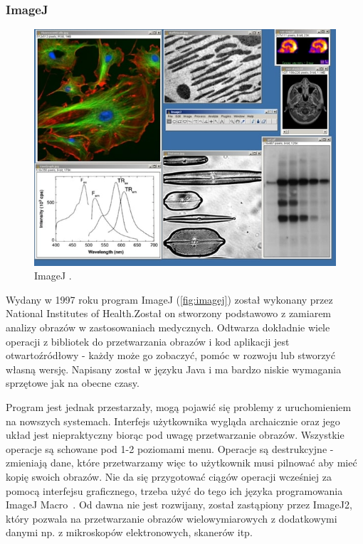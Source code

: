 \subsubsection{ImageJ}
\begin{figure}[H]
    \centering
    \includegraphics[width=0.8\linewidth]{./images/Picture3.jpg}
    \caption{ImageJ \cite{imagej}.}
    \label{fig:imagej}
\end{figure}

Wydany w 1997 roku program ImageJ (\autoref{fig:imagej}) został wykonany przez National Institutes of Health.Został on stworzony podstawowo z zamiarem analizy obrazów w zastosowaniach medycznych. 
Odtwarza dokładnie wiele operacji z bibliotek do przetwarzania obrazów i kod aplikacji jest otwartoźródłowy - każdy może go zobaczyć, pomóc w rozwoju lub stworzyć własną wersję. 
Napisany został w języku Java i ma bardzo niskie wymagania sprzętowe jak na obecne czasy.

Program jest jednak przestarzały, mogą pojawić się problemy z uruchomieniem na nowszych systemach. Interfejs użytkownika wygląda archaicznie oraz jego układ jest niepraktyczny biorąc pod uwagę przetwarzanie obrazów. 
Wszystkie operacje są schowane pod 1-2 poziomami menu. 
Operacje są destrukcyjne - zmieniają dane, które przetwarzamy więc to użytkownik musi pilnować aby mieć kopię swoich obrazów. 
Nie da się przygotować ciągów operacji wcześniej za pomocą interfejsu graficznego, trzeba użyć do tego ich języka programowania ImageJ Macro~\cite{imagejbatch}. 
Od dawna nie jest rozwijany, został zastąpiony przez ImageJ2, który pozwala na przetwarzanie obrazów wielowymiarowych z dodatkowymi danymi np. z mikroskopów elektronowych, skanerów itp.

